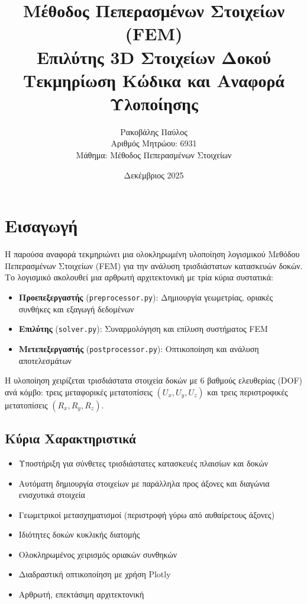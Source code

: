 \documentclass[12pt,a4paper]{article}
\title{\selectlanguage{greek}\textbf{Μέθοδος Πεπερασμένων Στοιχείων (FEM)\\
Επιλύτης 3D Στοιχείων Δοκού}\\
\large Τεκμηρίωση Κώδικα και Αναφορά Υλοποίησης}
\author{\selectlanguage{greek}Ρακοβάλης Παύλος\\
Αριθμός Μητρώου: 6931\\
\small Μάθημα: Μέθοδος Πεπερασμένων Στοιχείων}
\date{\selectlanguage{greek}Δεκέμβριος 2025}
\begin{document}

\maketitle
\thispagestyle{empty}

\newpage
\tableofcontents
\newpage

\section{Εισαγωγή}

Η παρούσα αναφορά τεκμηριώνει μια ολοκληρωμένη υλοποίηση λογισμικού Μεθόδου Πεπερασμένων Στοιχείων (FEM) για την ανάλυση τρισδιάστατων κατασκευών δοκών. Το λογισμικό ακολουθεί μια αρθρωτή αρχιτεκτονική με τρία κύρια συστατικά:

\begin{itemize}
    \item \textbf{Προεπεξεργαστής} (\texttt{preprocessor.py}): Δημιουργία γεωμετρίας, οριακές συνθήκες και εξαγωγή δεδομένων
    \item \textbf{Επιλύτης} (\texttt{solver.py}): Συναρμολόγηση και επίλυση συστήματος FEM
    \item \textbf{Μετεπεξεργαστής} (\texttt{postprocessor.py}): Οπτικοποίηση και ανάλυση αποτελεσμάτων
\end{itemize}

Η υλοποίηση χειρίζεται τρισδιάστατα στοιχεία δοκών με 6 βαθμούς ελευθερίας (DOF) ανά κόμβο: τρεις μεταφορικές μετατοπίσεις $(U_x, U_y, U_z)$ και τρεις περιστροφικές μετατοπίσεις $(R_x, R_y, R_z)$.

\subsection{Κύρια Χαρακτηριστικά}

\begin{itemize}
    \item Υποστήριξη για σύνθετες τρισδιάστατες κατασκευές πλαισίων και δοκών
    \item Αυτόματη δημιουργία στοιχείων με παράλληλα προς άξονες και διαγώνια ενισχυτικά στοιχεία
    \item Γεωμετρικοί μετασχηματισμοί (περιστροφή γύρω από αυθαίρετους άξονες)
    \item Ιδιότητες δοκών κυκλικής διατομής
    \item Ολοκληρωμένος χειρισμός οριακών συνθηκών
    \item Διαδραστική οπτικοποίηση με χρήση Plotly
    \item Αρθρωτή, επεκτάσιμη αρχιτεκτονική
\end{itemize}
\end{document}
